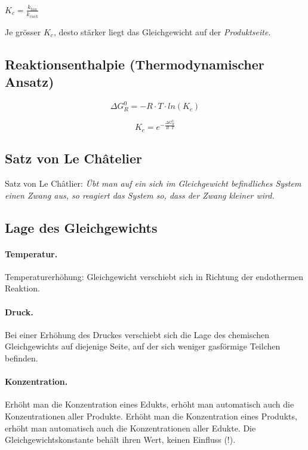 \begin{definition}[Gleichgewichtskonstante]
	{\large$K_c=\frac{k_{hin}}{k_{r\ddot{u}ck}}$}
	
	Je grösser $K_c$, desto stärker liegt das Gleichgewicht auf der \textit{Produktseite}.
\end{definition}

\subsection{Reaktionsenthalpie (Thermodynamischer Ansatz)}
{\large
\begin{equation}
	\Delta G^0_R = -R \cdot T \cdot ln(K_c)
\end{equation}

\begin{equation}
	K_c = e^{-\frac{\Delta G^0_R}{R \cdot T}}
\end{equation}

}

\subsection{Satz von Le Châtelier}

Satz von Le Châtlier:
\textit{Übt man auf ein sich im Gleichgewicht befindliches System einen Zwang aus, so reagiert das System so, dass der Zwang kleiner wird.}

\subsection{Lage des Gleichgewichts}

\paragraph{Temperatur.} Temperaturerhöhung: Gleichgewicht verschiebt sich in Richtung der endothermen Reaktion.

\paragraph{Druck.} Bei einer Erhöhung des Druckes verschiebt sich die Lage des chemischen Gleichgewichts auf diejenige Seite, auf der sich weniger gasförmige Teilchen befinden.

\paragraph{Konzentration.} Erhöht man die Konzentration eines Edukts, erhöht man automatisch auch die Konzentrationen aller Produkte. Erhöht man die Konzentration eines Produkts, erhöht man automatisch auch die Konzentrationen aller Edukte. Die Gleichgewichtskonstante behält ihren Wert, keinen Einfluss (!).

